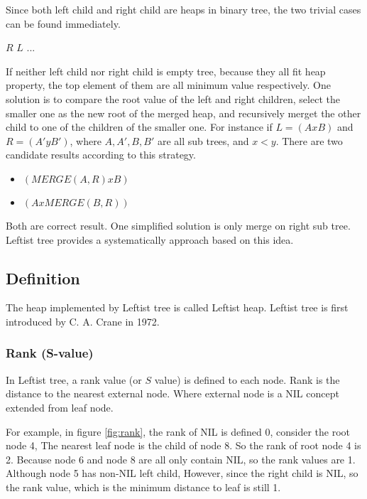 \documentclass{article}
\begin{document}
Since both left child and right child are heaps in binary tree, the two trivial
cases can be found immediately.

\begin{algorithmic}[1]
    \State \Return $R$
    \State \Return $L$
  \Else
    \State $...$
  \EndIf
\EndFunction
\end{algorithmic}

If neither left child nor right child is empty tree, because they all fit
heap property, the top element of them are all minimum value respectively.
One solution is to compare the root value of the left and right children,
select the smaller one as the new root of the merged heap, and recursively
merget the other child to one of the children of the smaller one. 
For instance if $L = (A x B)$ and $R = (A' y B')$, where $A, A', B, B'$ 
are all sub trees, and $x < y$. There are two candidate results according
to this strategy.

\begin{itemize}
\item $(MERGE(A, R) x B)$
\item $(A x MERGE(B, R))$
\end{itemize}

Both are correct result. One simplified solution is only merge on right
sub tree. Leftist tree provides a systematically approach based on this
idea.

\subsection{Definition}

The heap implemented by Leftist tree is called Leftist heap. Leftist
tree is first introduced by C. A. Crane in 1972\cite{wiki-leftist-tree}.

\subsubsection{Rank (S-value)}

In Leftist tree, a rank value (or $S$ value) is defined to each node. 
Rank is the distance to the nearest external node. Where external node
is a NIL concept extended from leaf node.

For example, in figure \ref{fig:rank}, the rank of NIL 
is defined 0, consider the root node 4, The nearest leaf node is 
the child of node 8. So the rank of root node 4 is 2. Because node 
6 and node 8 are all only contain NIL, so the rank values are 1. 
Although node 5 has non-NIL left child, However, since the right 
child is NIL, so the rank value, which is the minimum distance 
to leaf is still 1.
\end{document}
